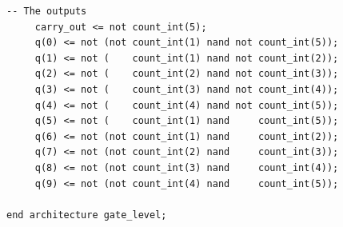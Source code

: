 \documentclass[12pt,a4paper,final,twoside,fleqn]{article}
\begin{document}
\begin{lstlisting}[caption=A VHDL description of the 4017 5-stage Johnson counter,label=cod:cd4017b]
	 -- The outputs
	 carry_out <= not count_int(5);
	 q(0) <= not (not count_int(1) nand not count_int(5));
	 q(1) <= not (    count_int(1) nand not count_int(2));
	 q(2) <= not (    count_int(2) nand not count_int(3));
	 q(3) <= not (    count_int(3) nand not count_int(4));
	 q(4) <= not (    count_int(4) nand not count_int(5));
	 q(5) <= not (    count_int(1) nand     count_int(5));
	 q(6) <= not (not count_int(1) nand     count_int(2));
	 q(7) <= not (not count_int(2) nand     count_int(3));
	 q(8) <= not (not count_int(3) nand     count_int(4));
	 q(9) <= not (not count_int(4) nand     count_int(5));
	 
end architecture gate_level;\end{lstlisting}

{}
\printbibliography{}
\end{document}
